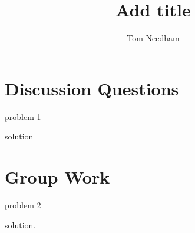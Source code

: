 \documentclass[]{ximera}
\author{Tom Needham}
\title[]{Add title}
\begin{document}
\begin{abstract}
\end{abstract}
\maketitle

\vspace{-0.9in}

\section{Discussion Questions}

\begin{problem}
problem 1
\end{problem}

\begin{freeResponse}
solution
\end{freeResponse}


\section{Group Work}

\begin{problem}
problem 2
\end{problem}

\begin{freeResponse}
solution.
\end{freeResponse}
\end{document}
